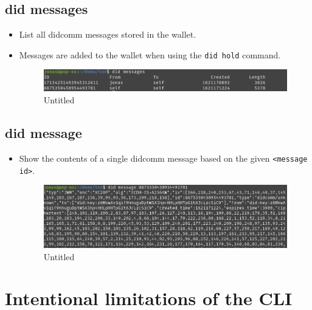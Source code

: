 \hypertarget{did-messages}{%
\subsection{did messages}\label{did-messages}}

\begin{itemize}
\item
  List all didcomm messages stored in the wallet.
\item
  Messages are added to the wallet when using the
  \lstinline!did hold! command.

  \begin{figure}
  \centering
  \includegraphics{User Interface f8759a9462b24d5f95cf6123d68b89ea/Untitled 15.png}
  \caption{Untitled}
  \end{figure}
\end{itemize}

\hypertarget{did-message}{%
\subsection{\texorpdfstring{did message
}{did message }}\label{did-message}}

\begin{itemize}
\item
  Show the contents of a single didcomm message based on the given
  \lstinline!<message id>!.

  \begin{figure}
  \centering
  \includegraphics{User Interface f8759a9462b24d5f95cf6123d68b89ea/Untitled 16.png}
  \caption{Untitled}
  \end{figure}
\end{itemize}

\hypertarget{intentional-limitations-of-the-cli}{%
\section{Intentional limitations of the
CLI}\label{intentional-limitations-of-the-cli}}

